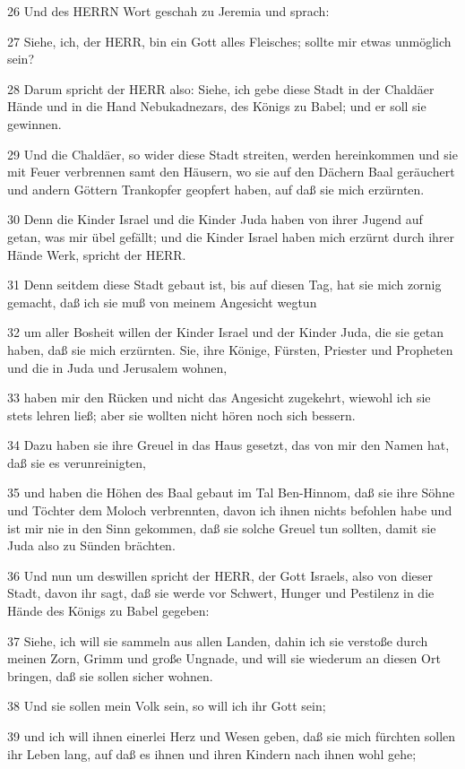 \par 26 Und des HERRN Wort geschah zu Jeremia und sprach:
\par 27 Siehe, ich, der HERR, bin ein Gott alles Fleisches; sollte mir etwas unmöglich sein?
\par 28 Darum spricht der HERR also: Siehe, ich gebe diese Stadt in der Chaldäer Hände und in die Hand Nebukadnezars, des Königs zu Babel; und er soll sie gewinnen.
\par 29 Und die Chaldäer, so wider diese Stadt streiten, werden hereinkommen und sie mit Feuer verbrennen samt den Häusern, wo sie auf den Dächern Baal geräuchert und andern Göttern Trankopfer geopfert haben, auf daß sie mich erzürnten.
\par 30 Denn die Kinder Israel und die Kinder Juda haben von ihrer Jugend auf getan, was mir übel gefällt; und die Kinder Israel haben mich erzürnt durch ihrer Hände Werk, spricht der HERR.
\par 31 Denn seitdem diese Stadt gebaut ist, bis auf diesen Tag, hat sie mich zornig gemacht, daß ich sie muß von meinem Angesicht wegtun
\par 32 um aller Bosheit willen der Kinder Israel und der Kinder Juda, die sie getan haben, daß sie mich erzürnten. Sie, ihre Könige, Fürsten, Priester und Propheten und die in Juda und Jerusalem wohnen,
\par 33 haben mir den Rücken und nicht das Angesicht zugekehrt, wiewohl ich sie stets lehren ließ; aber sie wollten nicht hören noch sich bessern.
\par 34 Dazu haben sie ihre Greuel in das Haus gesetzt, das von mir den Namen hat, daß sie es verunreinigten,
\par 35 und haben die Höhen des Baal gebaut im Tal Ben-Hinnom, daß sie ihre Söhne und Töchter dem Moloch verbrennten, davon ich ihnen nichts befohlen habe und ist mir nie in den Sinn gekommen, daß sie solche Greuel tun sollten, damit sie Juda also zu Sünden brächten.
\par 36 Und nun um deswillen spricht der HERR, der Gott Israels, also von dieser Stadt, davon ihr sagt, daß sie werde vor Schwert, Hunger und Pestilenz in die Hände des Königs zu Babel gegeben:
\par 37 Siehe, ich will sie sammeln aus allen Landen, dahin ich sie verstoße durch meinen Zorn, Grimm und große Ungnade, und will sie wiederum an diesen Ort bringen, daß sie sollen sicher wohnen.
\par 38 Und sie sollen mein Volk sein, so will ich ihr Gott sein;
\par 39 und ich will ihnen einerlei Herz und Wesen geben, daß sie mich fürchten sollen ihr Leben lang, auf daß es ihnen und ihren Kindern nach ihnen wohl gehe;
